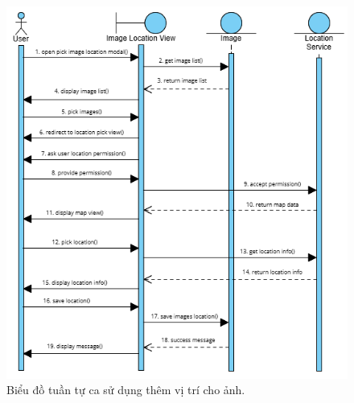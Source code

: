 \begin{figure}[H]
    \centering  
    \includegraphics[width=1.1\textwidth]{figures/c3/3-3-15-sequence-diagram.png}
    \caption{Biểu đồ tuần tự ca sử dụng thêm vị trí cho ảnh.}
    \label{fig:3-3-15-sequence-diagram}
\end{figure}
